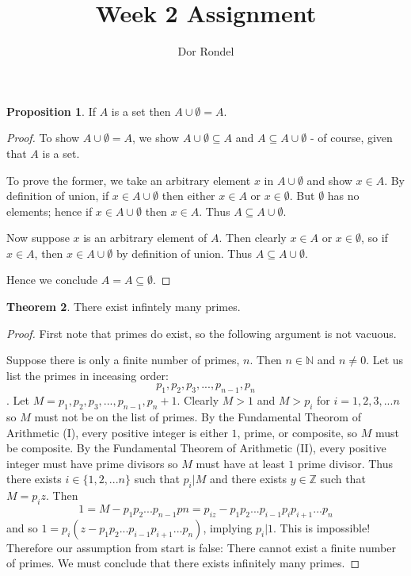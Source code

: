 \documentclass{article}
\title{Week 2 Assignment}
\author{Dor Rondel}
\theoremstyle{definition}
\newtheorem{thm}{Theorem}
\newtheorem{prop}[thm]{Proposition}
\begin{document}
\maketitle

\begin{prop}
If $A$ is a set then $A\cup\emptyset=A$.
\end{prop} 

\begin{proof}
To show $A\cup\emptyset=A$, we show $A \cup\emptyset\subseteq A$ and $A \subseteq A \cup \emptyset$ - of course, given that $A$ is a set. 

To prove the former, we take an arbitrary element $x$ in $A \cup \emptyset$ and show $x \in A$. By definition of union, if $x \in A \cup \emptyset$ then either $x \in A$ or $x \in \emptyset$. But $\emptyset$ has no elements; hence if $x \in A \cup \emptyset$ then $x \in A$. Thus $A \subseteq A \cup \emptyset$. 

Now suppose $x$ is an arbitrary element of $A$. Then clearly $x \in A$ or $x \in \emptyset$, so if $x \in A$, then $x \in A \cup \emptyset$ by definition of union. Thus $A \subseteq A \cup \emptyset$. 

Hence we conclude $A = A \subseteq \emptyset$.
\end{proof}

\begin{thm}
There exist infintely many primes.
\end{thm}

\begin{proof}
First note that primes do exist, so the following argument is not vacuous. 

Suppose there is only a finite number of primes, $n$. Then $n \in \mathbb{N}$ and $n \neq 0$. Let us list the primes in inceasing order: 
\begin{equation*}
p_1, p_2, p_3, ..., p_{n-1}, p_{n}
\end{equation*}.
Let $M = p_1, p_2, p_3, ..., p_{n-1}, p_{n} + 1$. Clearly $M > 1$ and $M > p_i$ for $i = 1,2,3, ... n$ so $M$ must not be on the list of primes. By the Fundamental Theorom of Arithmetic (I), every positive integer is either $1$, prime, or composite, so $M$ must be composite. By the Fundamental Theorem of Arithmetic (II), every positive integer must have prime divisors so $M$ must have at least $1$ prime divisor. Thus there exists $i \in \{1,2,...n\}$ such that $p_i \vert M$ and there exists $y
\in \mathbb{Z}$ such that $M = p_iz$. Then %
\begin{equation*}
1 = M - p_1p_2...p_{n-1}p{n} = p_{iz} - p_1p_2...p_{i-1}p_ip_{i+1}...p_n
\end{equation*}
and so $1=p_i(z-p_1p_2...p_{i-1}p_{i+1}...p_n)$, implying $p_i \vert 1$. This is impossible! Therefore our assumption from start is false: There cannot exist a finite number of primes. We must conclude that there exists infinitely many primes.
\end{proof}
\end{document}
